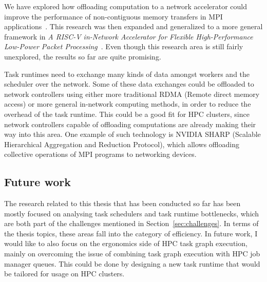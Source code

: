 We have explored how offloading computation to a network accelerator could improve the
performance of non-contiguous memory transfers in MPI applications~\cite{spin}. This
research was then expanded and generalized to a more general framework in \emph{A RISC-V in-Network
Accelerator for Flexible High-Performance Low-Power Packet Processing}~\cite{spin2}. Even though
this research area is still fairly unexplored, the results so far are quite promising.

Task runtimes need to exchange many kinds of data amongst workers and the scheduler over
the network. Some of these data exchanges could be offloaded to network controllers using either
more traditional RDMA (Remote direct memory access) or more general in-network computing
methods, in order to reduce the overhead of the task runtime. This could be a good fit for HPC
clusters, since network controllers capable of offloading computations are already making their
way into this area. One example of such technology is NVIDIA SHARP (Scalable Hierarchical
Aggregation and Reduction Protocol), which allows offloading collective operations of MPI
programs to networking devices.

\subsection{Future work}
The research related to this thesis that has been conducted so far has been mostly focused on
analysing task schedulers and task runtime bottlenecks, which are both part of the
challenges mentioned in Section~\ref{sec:challenges}. In terms of the thesis topics, these areas
fall into the category of efficiency. In future work, I would like to also focus on the
ergonomics side of HPC task graph execution, mainly on overcoming the issue of combining task
graph execution with HPC job manager queues. This could be done by designing a new task runtime
that would be tailored for usage on HPC clusters.
